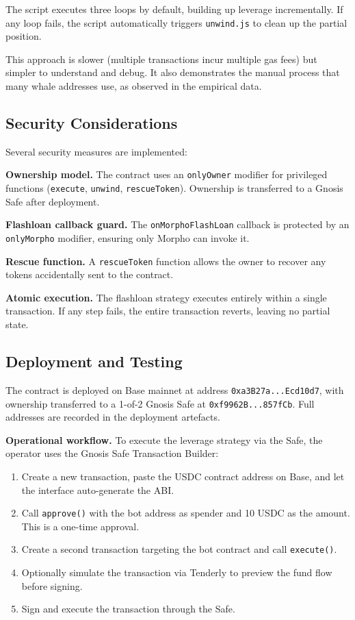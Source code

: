 The script executes three loops by default, building up leverage incrementally. If any loop fails, the script automatically triggers \texttt{unwind.js} to clean up the partial position.

This approach is slower (multiple transactions incur multiple gas fees) but simpler to understand and debug. It also demonstrates the manual process that many whale addresses use, as observed in the empirical data.

\subsection{Security Considerations}

Several security measures are implemented:

\textbf{Ownership model.} The contract uses an \texttt{onlyOwner} modifier for privileged functions (\texttt{execute}, \texttt{unwind}, \texttt{rescueToken}). Ownership is transferred to a Gnosis Safe after deployment.

\textbf{Flashloan callback guard.} The \texttt{onMorphoFlashLoan} callback is protected by an \texttt{onlyMorpho} modifier, ensuring only Morpho can invoke it.

\textbf{Rescue function.} A \texttt{rescueToken} function allows the owner to recover any tokens accidentally sent to the contract.

\textbf{Atomic execution.} The flashloan strategy executes entirely within a single transaction. If any step fails, the entire transaction reverts, leaving no partial state.

\subsection{Deployment and Testing}

The contract is deployed on Base mainnet at address \texttt{0xa3B27a...Ecd10d7}, with ownership transferred to a 1-of-2 Gnosis Safe at \texttt{0xf9962B...857fCb}. Full addresses are recorded in the deployment artefacts.

\textbf{Operational workflow.} To execute the leverage strategy via the Safe, the operator uses the Gnosis Safe Transaction Builder:
\begin{enumerate}
    \item Create a new transaction, paste the USDC contract address on Base, and let the interface auto-generate the ABI.
    \item Call \texttt{approve()} with the bot address as spender and 10 USDC as the amount. This is a one-time approval.
    \item Create a second transaction targeting the bot contract and call \texttt{execute()}.
    \item Optionally simulate the transaction via Tenderly to preview the fund flow before signing.
    \item Sign and execute the transaction through the Safe.
\end{enumerate}

